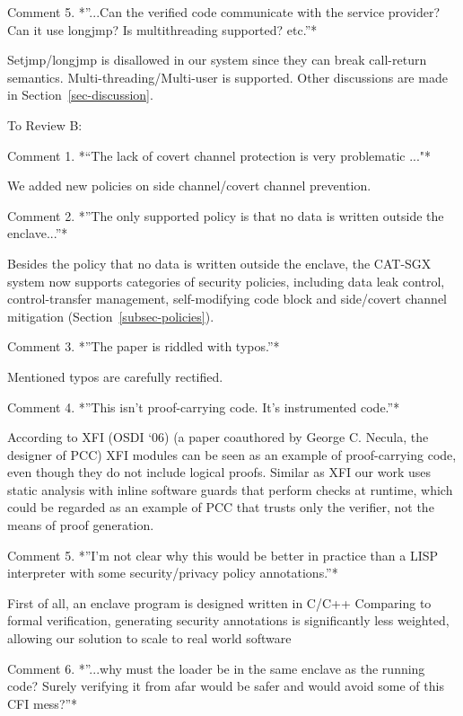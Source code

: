 {Comment 5. *”...Can the verified code communicate with the service provider? Can it use longjmp? Is multithreading supported? etc.”*

Setjmp/longjmp is disallowed in our system since they can break
call-return semantics. Multi-threading/Multi-user is supported. Other discussions are made in Section~\ref{sec-discussion}.

To Review B:

Comment 1. *“The lack of covert channel protection is very problematic ..."*

We added new policies on side channel/covert channel prevention.

Comment 2. *”The only supported policy is that no data is written outside the enclave...”*

Besides the policy that no data is written outside the enclave, the CAT-SGX system now supports categories of security policies, including data leak control, control-transfer management, self-modifying code block and side/covert channel mitigation (Section~\ref{subsec-policies}).

Comment 3. *”The paper is riddled with typos.”*

Mentioned typos are carefully rectified.

Comment 4. *”This isn't proof-carrying code.  It's instrumented code.”*

According to XFI (OSDI `06) (a paper coauthored by George C. Necula, the designer of PCC) XFI modules can be seen as an example of proof-carrying code, even though they do not include logical proofs. Similar as XFI our work uses static analysis with inline software guards that perform checks at runtime, which could be regarded as an example of PCC that trusts only the verifier, not the means of proof generation.

Comment 5. *”I'm not clear why this would be better in practice than a LISP interpreter with some security/privacy policy annotations.”*

First of all, an enclave program is designed written in C/C++
Comparing to formal verification, generating security annotations is significantly less weighted, allowing our solution to scale to real world software


Comment 6. *”...why must the loader be in the same enclave as the running code?  Surely verifying it from afar would be safer and would avoid some of this CFI mess?”*

}
